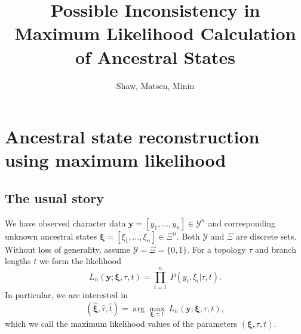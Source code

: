 \documentclass[a4paper]{article}
\title{Possible Inconsistency in Maximum Likelihood Calculation of Ancestral States}
\author{Shaw, Matsen, Minin}
\begin{document}
\maketitle


\renewcommand{\arraystretch}{1.2} %

\section{Ancestral state reconstruction using maximum likelihood}

\subsection{The usual story}

We have observed character data $\mathbf{y}=[y_1,\ldots,y_n]\in\mathcal{Y}^n$ and corresponding unknown ancestral states $\boldsymbol\xi=[\xi_1,\ldots,\xi_n]\in\Xi^n$.
Both $\mathcal{Y}$ and $\Xi$ are discrete sets.
Without loss of generality, assume $\mathcal{Y}=\Xi=\{0,1\}$.
For a topology $\tau$ and branch lengths $t$ we form the likelihood
\begin{equation}
\label{eq:full_likelihood}
L_n(\mathbf{y};\boldsymbol\xi, \tau, t) = \prod_{i=1}^{n} \ P(y_i, \xi_i | \tau, t).
\end{equation}
In particular, we are interested in
$$
(\hat{\boldsymbol\xi}, \hat{\tau}, \hat{t}) = \arg\max_{\boldsymbol\xi, \tau, t} \ L_n(\mathbf{y};\boldsymbol\xi, \tau, t),
$$
which we call the maximum likelihood values of the parameters $(\boldsymbol\xi, \tau, t)$.
\end{document}
